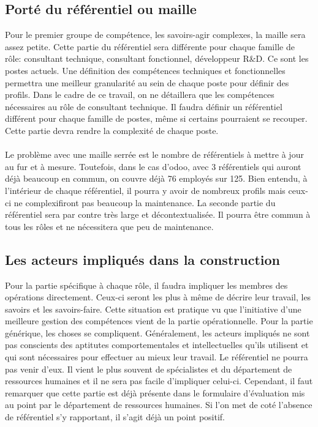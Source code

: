 \subsection{Porté du référentiel ou maille}
Pour le premier groupe de compétence, les savoirs-agir complexes, la maille sera assez petite. Cette partie du référentiel sera différente pour chaque famille de rôle: consultant technique, consultant fonctionnel, développeur R\&D. Ce sont les postes actuels. Une définition des compétences techniques et fonctionnelles permettra une meilleur granularité au sein de chaque poste pour définir des profils. Dans le cadre de ce travail, on ne détaillera que les compétences nécessaires au rôle de consultant technique. Il faudra définir un référentiel différent pour chaque famille de postes, même si certains pourraient se recouper. Cette partie devra rendre la complexité de chaque poste. 

\paragraph{}Le problème avec une maille serrée est le nombre de référentiels à mettre à jour au fur et à mesure.
 Toutefois, dans le cas d'odoo, avec 3 référentiels qui auront déjà beaucoup en commun, on couvre déjà 76 employés sur 125. Bien entendu, à l'intérieur de chaque référentiel, il pourra y avoir de nombreux profils mais ceux-ci ne complexifiront pas beaucoup la maintenance. La seconde partie du référentiel sera par contre très large et décontextualisée. Il pourra être commun à tous les rôles et ne nécessitera que peu de maintenance. 

\subsection{Les acteurs impliqués dans la construction}
Pour la partie spécifique à chaque rôle, il faudra impliquer les membres des opérations directement. Ceux-ci seront les plus à même de décrire leur travail, les savoirs et les savoirs-faire. Cette situation est pratique vu que l'initiative d'une meilleure gestion des compétences vient de la partie opérationnelle. Pour la partie générique, les choses se compliquent. Généralement, les acteurs impliqués ne sont pas conscients des aptitutes comportementales et intellectuelles qu'ils utilisent et qui sont nécessaires pour effectuer au mieux leur travail. Le référentiel ne pourra pas venir d'eux. Il vient le plus souvent de spécialistes et du département de ressources humaines et il ne sera pas facile d'impliquer celui-ci. Cependant, il faut remarquer que cette partie est déjà présente dans le formulaire d'évaluation mis au point par le département de ressources humaines. Si l'on met de coté l'absence de référentiel s'y rapportant, il s'agit déjà un point positif.



